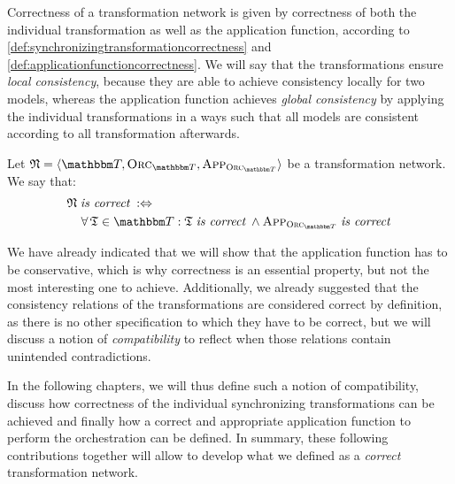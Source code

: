 Correctness of a transformation network is given by correctness of both the individual transformation as well as the application function, according to \autoref{def:synchronizingtransformationcorrectness} and \autoref{def:applicationfunctioncorrectness}.
We will say that the transformations ensure \emph{local consistency}, because they are able to achieve consistency locally for two models, whereas the application function achieves \emph{global consistency} by applying the individual transformations in a ways such that all models are consistent according to all transformation afterwards.

\begin{definition}
    \label{def:transformationnetworkcorrectness}
    Let $\transformationnetwork{N} = \tupled{\transformationset{T}, \orcfunction{\transformationset{T}}, \appfunction{\orcfunction{\transformationset{T}}}}$ be a transformation network.
    We say that:
    \begin{align*}
        & 
        \transformationnetwork{N} \mathtext{is correct} \equivalentperdefinition \\
        & \formulaskip
        \forall \transformation{T} \in \transformationset{T} : \transformation{T} \mathtext{is correct} \land \appfunction{\orcfunction{\transformationset{T}}} \mathtext{is correct}
    \end{align*}
\end{definition}

We have already indicated that we will show that the application function has to be conservative, which is why correctness is an essential property, but not the most interesting one to achieve.
Additionally, we already suggested that the consistency relations of the transformations are considered correct by definition, as there is no other specification to which they have to be correct, but we will discuss a notion of \emph{compatibility} to reflect when those relations contain unintended contradictions.

In the following chapters, we will thus define such a notion of compatibility, discuss how correctness of the individual synchronizing transformations can be achieved and finally how a correct and appropriate application function to perform the orchestration can be defined.
In summary, these following contributions together will allow to develop what we defined as a \emph{correct} transformation network.




